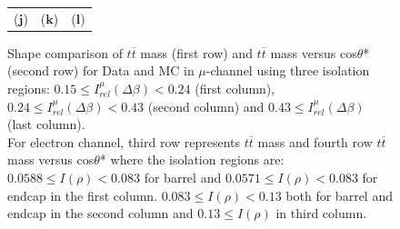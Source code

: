 \begin{figure}[htp]
\begin{tabular}{ccc}
   ($\mathbf{j}$)\qquad\qquad&($\mathbf{k}$)\qquad\qquad\qquad&($\mathbf{l}$)\qquad\qquad\qquad\\
\end{tabular}
\caption{Shape comparison of $t\overline{t}$ mass (first row) and $t\overline{t}$ mass versus cos$\theta$* (second row) for Data and MC in $\mu$-channel using three isolation regions: $0.15 \leq I_{rel}^{\mu}(\Delta\beta) < 0.24$ (first column), $0.24 \leq I_{rel}^{\mu}(\Delta\beta) < 0.43$ (second column) and $0.43 \leq I_{rel}^{\mu}(\Delta\beta)$ (last column).\\
For electron channel, third row represents $t\overline{t}$ mass and fourth row $t\overline{t}$ mass versus cos$\theta$* where the isolation regions are: $0.0588 \leq I(\rho) < 0.083$ for barrel and $0.0571 \leq I(\rho) < 0.083$ for endcap in the first column. $0.083 \leq I(\rho) < 0.13$ both for barrel and endcap in the second column and $0.13 \leq I(\rho)$ in third column.}
\label{Fig:qcd_3region_shapes}
\end{figure}
